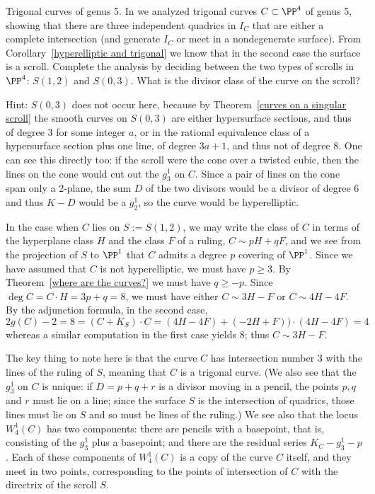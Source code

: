 
\begin{exercise} Trigonal curves of genus 5.\label{extrigonal genus 5} 
In 
 we analyzed trigonal curves $C\subset \PP^4$ of genus 5, showing that
there are three independent quadrics in $I_C$ that are either a complete intersection (and generate $I_C$ or
meet in a nondegenerate surface). From Corollary~\ref{hyperelliptic and trigonal} we know that in the second case
the surface is a scroll. Complete the analysis by deciding between the two types of scrolls in $\PP^4$: $S(1,2)$ and $S(0,3)$.
What is the divisor class of the curve on the scroll?

 Hint: $S(0,3)$ does not occur here, because by Theorem~\ref{curves on a singular scroll} the smooth curves on $S(0,3)$ are either hypersurface sections, and thus of degree $3$ for
some integer $a$, or in the rational equivalence class of a hypersurface section plus one line,
of degree $3a+1$, and thus not of degree 8. One can see this directly too: if the scroll were the cone over
a twisted cubic, then the lines on the cone would cut out the $g^1_3$ on $C$. Since a pair of lines on the cone span
only a 2-plane, the sum $D$ of the two divisors would be a divisor of degree 6  and thus $K-D$ would be a $g^1_2$, 
so the curve would be hyperelliptic.

In the case when $C$ lies on $S := S(1,2)$, we may write the class of $C$ in terms of the hyperplane class $H$ and the class $F$ of a ruling, $C\sim pH+qF$, and we see from the 
projection of $S$ to $\PP^1$ that $C$ admits
a degree $p$ covering of $\PP^1$. Since we have assumed that $C$ is not hyperelliptic,
we must have $p\geq 3$. By Theorem~\ref{where are the curves?} we must have
$q\geq -p$. Since $\deg C = C\cdot H = 3p+q = 8$, we must have either 
$C\sim 3H-F$ or $C\sim 4H-4F$. By the adjunction formula, in the second case,
$$
2g(C)-2 = 8 = (C+K_S)\cdot C = (4H-4F)+(-2H+F))\cdot(4H-4F) =4
$$
whereas a similar computation in the first case yields 8; thus $C\sim 3H-F$.

The key thing to note here is that the curve $C$ has intersection number 3 with the lines of the ruling of $S$, meaning that $C$ is a trigonal curve. (We also see that the $g^1_3$ on $C$ is unique: if $D = p + q + r$ is a divisor moving in a pencil, the points $p, q$ and $r$ must lie on a line; since the surface $S$ is the intersection of quadrics, those lines must lie on $S$ and so must be  lines  of the ruling.) We see also that the locus $W^1_4(C)$ has two components: there are pencils with a basepoint, that is, consisting of the $g^1_3$ plus a basepoint; and there are the residual series $K_C - g^1_3 - p$. Each of these components of $W^1_4(C)$ is a copy of the curve $C$ itself, and they meet in two points, corresponding to the points of intersection of $C$ with the directrix of the scroll $S$.
\end{exercise}

